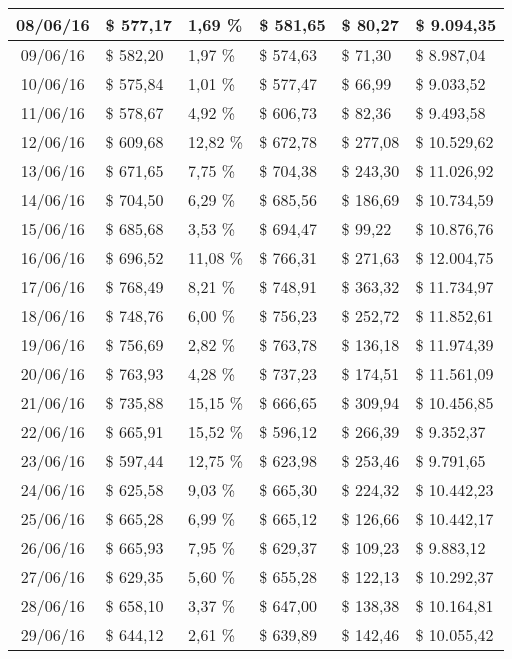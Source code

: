 \begin{small}
\begin{longtable}{|c|l|l|l|l|l|}
08/06/16 & \$ 577,17 & 1,69 \% & \$ 581,65 & \$ 80,27 & \$ 9.094,35 \\ \hline
09/06/16 & \$ 582,20 & 1,97 \% & \$ 574,63 & \$ 71,30 & \$ 8.987,04 \\ \hline
10/06/16 & \$ 575,84 & 1,01 \% & \$ 577,47 & \$ 66,99 & \$ 9.033,52 \\ \hline
11/06/16 & \$ 578,67 & 4,92 \% & \$ 606,73 & \$ 82,36 & \$ 9.493,58 \\ \hline
12/06/16 & \$ 609,68 & 12,82 \% & \$ 672,78 & \$ 277,08 & \$ 10.529,62 \\ \hline
13/06/16 & \$ 671,65 & 7,75 \% & \$ 704,38 & \$ 243,30 & \$ 11.026,92 \\ \hline
14/06/16 & \$ 704,50 & 6,29 \% & \$ 685,56 & \$ 186,69 & \$ 10.734,59 \\ \hline
15/06/16 & \$ 685,68 & 3,53 \% & \$ 694,47 & \$ 99,22 & \$ 10.876,76 \\ \hline
16/06/16 & \$ 696,52 & 11,08 \% & \$ 766,31 & \$ 271,63 & \$ 12.004,75 \\ \hline
17/06/16 & \$ 768,49 & 8,21 \% & \$ 748,91 & \$ 363,32 & \$ 11.734,97 \\ \hline
18/06/16 & \$ 748,76 & 6,00 \% & \$ 756,23 & \$ 252,72 & \$ 11.852,61 \\ \hline
19/06/16 & \$ 756,69 & 2,82 \% & \$ 763,78 & \$ 136,18 & \$ 11.974,39 \\ \hline
20/06/16 & \$ 763,93 & 4,28 \% & \$ 737,23 & \$ 174,51 & \$ 11.561,09 \\ \hline
21/06/16 & \$ 735,88 & 15,15 \% & \$ 666,65 & \$ 309,94 & \$ 10.456,85 \\ \hline
22/06/16 & \$ 665,91 & 15,52 \% & \$ 596,12 & \$ 266,39 & \$ 9.352,37 \\ \hline
23/06/16 & \$ 597,44 & 12,75 \% & \$ 623,98 & \$ 253,46 & \$ 9.791,65 \\ \hline
24/06/16 & \$ 625,58 & 9,03 \% & \$ 665,30 & \$ 224,32 & \$ 10.442,23 \\ \hline
25/06/16 & \$ 665,28 & 6,99 \% & \$ 665,12 & \$ 126,66 & \$ 10.442,17 \\ \hline
26/06/16 & \$ 665,93 & 7,95 \% & \$ 629,37 & \$ 109,23 & \$ 9.883,12 \\ \hline
27/06/16 & \$ 629,35 & 5,60 \% & \$ 655,28 & \$ 122,13 & \$ 10.292,37 \\ \hline
28/06/16 & \$ 658,10 & 3,37 \% & \$ 647,00 & \$ 138,38 & \$ 10.164,81 \\ \hline
29/06/16 & \$ 644,12 & 2,61 \% & \$ 639,89 & \$ 142,46 & \$ 10.055,42 \\ \hline

\end{longtable}
\end{small}
